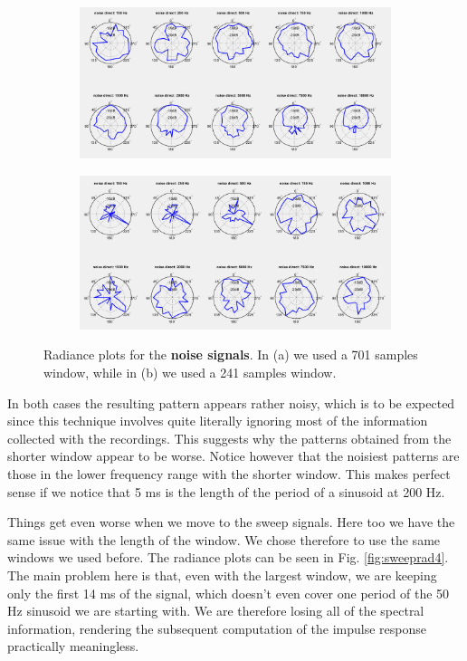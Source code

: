 \documentclass[a4paper]{article}
\begin{document}
\begin{figure}[h]
	\centering
	\begin{subfigure}{0.85\linewidth}
		\centering
		\includegraphics[width=\linewidth]{4a_radiance.png}
		\caption{}
	\end{subfigure}

	\begin{subfigure}{0.85\linewidth}
		\centering
		\includegraphics[width=\linewidth]{4a_radiance_120.png}
		\caption{}
	\end{subfigure}
	\caption{Radiance plots for the \textbf{noise signals}. In (a) we used a 701 samples window, while in (b) we used a 241 samples window.}
	\label{fig:noiserad4}
\end{figure}

In both cases the resulting pattern appears rather noisy, which is to be expected since this technique involves quite literally ignoring most of the information collected with the recordings. This suggests why the patterns obtained from the shorter window appear to be worse. Notice however that the noisiest patterns are those in the lower frequency range with the shorter window. This makes perfect sense if we notice that 5 ms is the length of the period of a sinusoid at 200 Hz.

Things get even worse when we move to the sweep signals. Here too we have the same issue with the length of the window. We chose therefore to use the same windows we used before. The radiance plots can be seen in Fig. \ref{fig:sweeprad4}. The main problem here is that, even with the largest window, we are keeping only the first 14 ms of the signal, which doesn't even cover one period of the 50 Hz sinusoid we are starting with. We are therefore losing all of the spectral information, rendering the subsequent computation of the impulse response practically meaningless.
\end{document}
